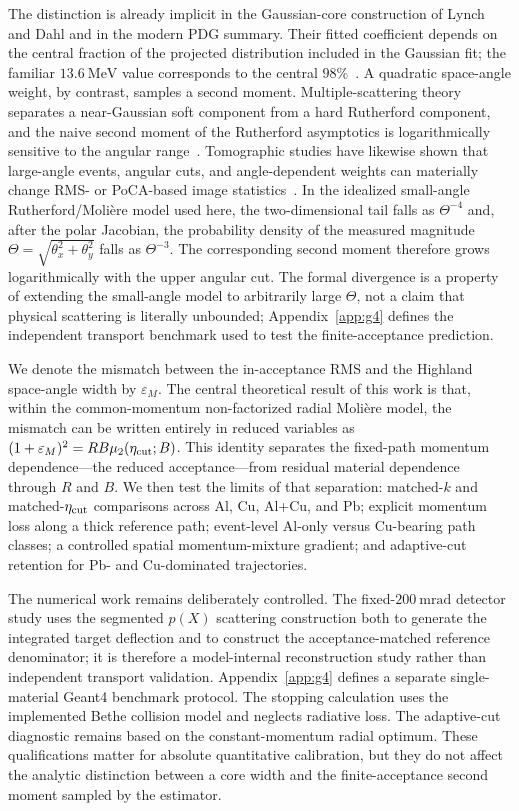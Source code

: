 \documentclass[aps,pra,reprint,longbibliography,floatfix]{revtex4-2}
\newcommand{\epsM}{\ensuremath{\varepsilon_M}}
\begin{document}
The distinction is already implicit in the Gaussian-core construction of Lynch and Dahl and in the modern PDG summary.  Their fitted coefficient depends on the central fraction of the projected distribution included in the Gaussian fit; the familiar $13.6~\mathrm{MeV}$ value corresponds to the central $98\%$~\cite{lynch1991,pdg2026}.  A quadratic space-angle weight, by contrast, samples a second moment.  Multiple-scattering theory separates a near-Gaussian soft component from a hard Rutherford component, and the naive second moment of the Rutherford asymptotics is logarithmically sensitive to the angular range~\cite{moliere1948,bethe1953,scott1963,bondarenco2016}.  Tomographic studies have likewise shown that large-angle events, angular cuts, and angle-dependent weights can materially change RMS- or PoCA-based image statistics~\cite{riggi2021,wen2023,wang2025}.  In the idealized small-angle Rutherford/Moli\`ere model used here, the two-dimensional tail falls as $\Theta^{-4}$ and, after the polar Jacobian, the probability density of the measured magnitude $\Theta=\sqrt{\theta_x^2+\theta_y^2}$ falls as $\Theta^{-3}$.  The corresponding second moment therefore grows logarithmically with the upper angular cut.  The formal divergence is a property of extending the small-angle model to arbitrarily large $\Theta$, not a claim that physical scattering is literally unbounded; Appendix~\ref{app:g4} defines the independent transport benchmark used to test the finite-acceptance prediction.

We denote the mismatch between the in-acceptance RMS and the Highland space-angle width by $\epsM$.  The central theoretical result of this work is that, within the common-momentum non-factorized radial Moli\`ere model, the mismatch can be written entirely in reduced variables as $(1+\epsM)^2=RB\mu_2(\eta_{\rm cut};B)$.  This identity separates the fixed-path momentum dependence---the reduced acceptance---from residual material dependence through $R$ and $B$.  We then test the limits of that separation: matched-$k$ and matched-$\eta_{\rm cut}$ comparisons across Al, Cu, Al+Cu, and Pb; explicit momentum loss along a thick reference path; event-level Al-only versus Cu-bearing path classes; a controlled spatial momentum-mixture gradient; and adaptive-cut retention for Pb- and Cu-dominated trajectories.

The numerical work remains deliberately controlled.  The fixed-$200~\mathrm{mrad}$ detector study uses the segmented $p(X)$ scattering construction both to generate the integrated target deflection and to construct the acceptance-matched reference denominator; it is therefore a model-internal reconstruction study rather than independent transport validation.  Appendix~\ref{app:g4} defines a separate single-material Geant4 benchmark protocol.  The stopping calculation uses the implemented Bethe collision model and neglects radiative loss.  The adaptive-cut diagnostic remains based on the constant-momentum radial optimum.  These qualifications matter for absolute quantitative calibration, but they do not affect the analytic distinction between a core width and the finite-acceptance second moment sampled by the estimator.
\end{document}
